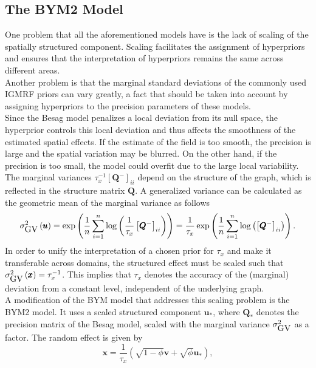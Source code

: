 \subsection{The BYM2 Model}\label{sec:bym2}
One problem that all the aforementioned models have is the lack of scaling of the spatially structured component. Scaling facilitates the assignment of hyperpriors and ensures that the interpretation of hyperpriors remains the same across different areas. \\
Another problem is that the marginal standard deviations of the commonly used IGMRF priors can vary greatly, a fact that should be taken into account by assigning hyperpriors to the precision parameters of these models. \\
Since the Besag model penalizes a local deviation from its null space, the hyperprior controls this local deviation and thus affects the smoothness of the estimated spatial effects. If the estimate of the field is too smooth, the precision is large and the spatial variation may be blurred. On the other hand, if the precision is too small, the model could overfit due to the large local variability. \\
The marginal variances $\tau_x^{-1}\left[\pmb{Q}^{-}\right]_{ii}$ depend on the structure of the graph, which is reflected in the structure matrix $\pmb{Q}$. A generalized variance can be calculated as the geometric mean of the marginal variance as follows
\begin{equation}\label{eq:bym_scale}
    \sigma_{\hbox{GV}}^2\left(\pmb{u}\right)=\exp\left(\frac{1}{n}\sum_{i=1}^n\log\left(\frac{1}{\tau_x}\left[\pmb{Q}^{-}\right]_{ii}\right)\right)=\frac{1}{\tau_x}\exp\left(\frac{1}{n}\sum_{i=1}^n\log\left(\left[\pmb{Q}^{-}\right]_{ii}\right)\right).
\end{equation}
In order to unify the interpretation of a chosen prior for $\tau_x$ and make it transferable across domains, the structured effect must be scaled such that $\sigma_{\hbox{GV}}^2\left(\pmb{x}\right)=\tau_x^{-1}$. This implies that $\tau_x$ denotes the accuracy of the (marginal) deviation from a constant level, independent of the underlying graph. \\
A modification of the BYM model that addresses this scaling problem is the BYM2 model. It uses a scaled structured component $\pmb{u}_{*}$, where $\pmb{Q}_{*}$ denotes the precision matrix of the Besag model, scaled with the marginal variance $\sigma_{\hbox{GV}}^2$ as a factor. The random effect is given by
\begin{equation}\label{eq:bym2_1}
    \pmb{x}=\frac{1}{\tau_x}\left(\sqrt{1-\phi}\pmb{v}+\sqrt{\phi}\pmb{u}_{*}\right),
\end{equation}
